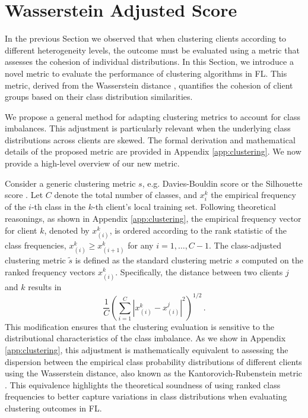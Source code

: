 \section{Wasserstein Adjusted Score}\label{clustereing_metric}

In the previous Section we observed that when clustering clients according to different heterogeneity levels, the outcome must be evaluated using a metric that assesses the cohesion of individual distributions. In this Section, we introduce a novel metric to evaluate the performance of clustering algorithms in FL. This metric, derived from the Wasserstein distance \citep{kantorovich1942translocation}, quantifies the cohesion of client groups based on their class distribution similarities. 

We propose a general method for adapting clustering metrics to account for class imbalances. This adjustment is particularly relevant when the underlying class distributions across clients are skewed. The formal derivation and mathematical details of the proposed metric are provided in Appendix \ref{app:clustering}. We now provide a high-level overview of our new metric.

Consider a generic clustering metric $s$, e.g. Davies-Bouldin score \citep{davies1979cluster} or the Silhouette score \citep{rousseeuw1987silhouettes}. Let $C$ denote the total number of classes, and $x_i^k$ the empirical frequency of the $i$-th class in the $k$-th client's local training set. Following theoretical reasonings, as shown in Appendix \ref{app:clustering}, the empirical frequency vector for client $k$, denoted by $x_{(i)}^k$, is ordered according to the rank statistic of the class frequencies, \ie  $x_{(i)}^k \geq x_{(i+1)}^k$ for any $i = 1, \dots, C-1$.
The class-adjusted clustering metric $\tilde{s}$ is defined as the standard clustering metric $s$ computed on the ranked frequency vectors $x_{(i)}^k$.  Specifically, the distance between two clients $j$ and $k$ results in
\vspace{-.8em}
\begin{equation}\label{lab_dist_class}
    \dfrac{1}{C}\left(\sum_{i = 1}^C \left | x_{(i)}^k - x_{(i)}^j \right | ^2\right)^{1/2}\,.
\end{equation}
This modification ensures that the clustering evaluation is sensitive to the distributional characteristics of the class imbalance. As we show in Appendix \ref{app:clustering}, this adjustment is mathematically equivalent to assessing the dispersion between the empirical class probability distributions of different clients using the Wasserstein distance, also known as the Kantorovich-Rubenstein metric \citep{kantorovich1942translocation}. This equivalence highlights the theoretical soundness of using ranked class frequencies to better capture variations in class distributions when evaluating clustering outcomes in FL.
